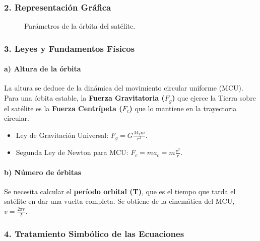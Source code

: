 \subsubsection*{2. Representación Gráfica}
\begin{figure}[H]
    \centering
    \caption{Parámetros de la órbita del satélite.}
\end{figure}

\subsubsection*{3. Leyes y Fundamentos Físicos}
\paragraph*{a) Altura de la órbita}
La altura se deduce de la dinámica del movimiento circular uniforme (MCU). Para una órbita estable, la \textbf{Fuerza Gravitatoria ($F_g$)} que ejerce la Tierra sobre el satélite es la \textbf{Fuerza Centrípeta ($F_c$)} que lo mantiene en la trayectoria circular.
\begin{itemize}
    \item Ley de Gravitación Universal: $F_g = G \frac{M_T m}{r^2}$.
    \item Segunda Ley de Newton para MCU: $F_c = m a_c = m \frac{v^2}{r}$.
\end{itemize}
\paragraph*{b) Número de órbitas}
Se necesita calcular el \textbf{período orbital (T)}, que es el tiempo que tarda el satélite en dar una vuelta completa. Se obtiene de la cinemática del MCU, $v = \frac{2\pi r}{T}$.

\subsubsection*{4. Tratamiento Simbólico de las Ecuaciones}
